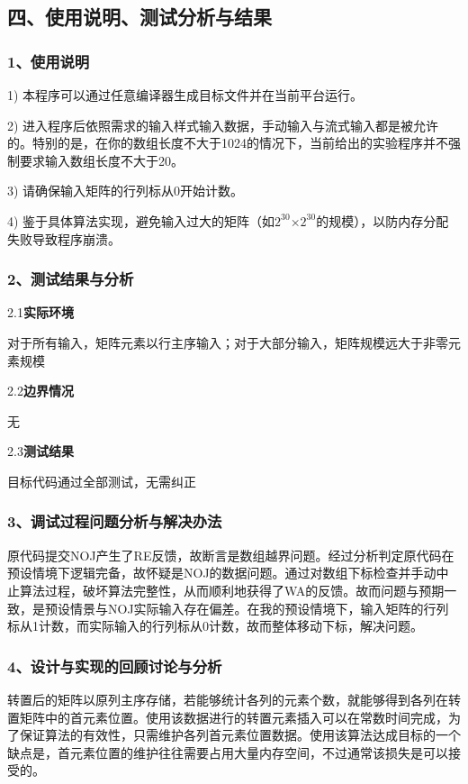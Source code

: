 \documentclass[UTF8, a4paper]{ctexart}
\begin{document}
\subsection*{四、使用说明、测试分析与结果}
\subsubsection*{1、使用说明}
1) 本程序可以通过任意编译器生成目标文件并在当前平台运行。 \par
2) 进入程序后依照需求的输入样式输入数据，手动输入与流式输入都是被允许的。特别的是，在你的数组长度不大于1024的情况下，当前给出的实验程序并不强制要求输入数组长度不大于20。 \par
3) 请确保输入矩阵的行列标从0开始计数。 \par
4) 鉴于具体算法实现，避免输入过大的矩阵（如$2^{30}$×$2^{30}$的规模），以防内存分配失败导致程序崩溃。
\subsubsection*{2、测试结果与分析}
2.1\;\textbf{实际环境} \par
对于所有输入，矩阵元素以行主序输入；对于大部分输入，矩阵规模远大于非零元素规模 \par
2.2\;\textbf{边界情况} \par
无 \par
2.3\;\textbf{测试结果} \par
目标代码通过全部测试，无需纠正
\subsubsection*{3、调试过程问题分析与解决办法}
原代码提交NOJ产生了RE反馈，故断言是数组越界问题。经过分析判定原代码在预设情境下逻辑完备，故怀疑是NOJ的数据问题。通过对数组下标检查并手动中止算法过程，破坏算法完整性，从而顺利地获得了WA的反馈。故而问题与预期一致，是预设情景与NOJ实际输入存在偏差。在我的预设情境下，输入矩阵的行列标从1计数，而实际输入的行列标从0计数，故而整体移动下标，解决问题。
\subsubsection*{4、设计与实现的回顾讨论与分析}
转置后的矩阵以原列主序存储，若能够统计各列的元素个数，就能够得到各列在转置矩阵中的首元素位置。使用该数据进行的转置元素插入可以在常数时间完成，为了保证算法的有效性，只需维护各列首元素位置数据。使用该算法达成目标的一个缺点是，首元素位置的维护往往需要占用大量内存空间，不过通常该损失是可以接受的。
\end{document}
